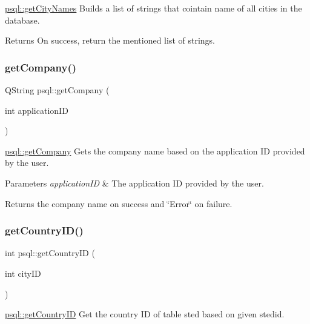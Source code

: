 \hyperlink{classpsql_a42ee0cf90055ba6a7a6f564cf04d8bb8}{psql\+::get\+City\+Names} Builds a list of strings that cointain name of all cities in the database. 

\begin{DoxyReturn}{Returns}
On success, return the mentioned list of strings. 
\end{DoxyReturn}
\mbox{\label{classpsql_a09745cd03f09ffb2dacacaab4281915f}} 
\subsubsection{\texorpdfstring{get\+Company()}{getCompany()}}
{\footnotesize\ttfamily Q\+String psql\+::get\+Company (\begin{DoxyParamCaption}\item[{int}]{application\+ID }\end{DoxyParamCaption})}



\hyperlink{classpsql_a09745cd03f09ffb2dacacaab4281915f}{psql\+::get\+Company} Gets the company name based on the application ID provided by the user. 


\begin{DoxyParams}{Parameters}
{\em application\+ID} & The application ID provided by the user. \\
\hline
\end{DoxyParams}
\begin{DoxyReturn}{Returns}
the company name on success and \char`\"{}\+Error\char`\"{} on failure. 
\end{DoxyReturn}
\mbox{\label{classpsql_a81d02dc0350ba11d90257914078ba432}} 
\subsubsection{\texorpdfstring{get\+Country\+I\+D()}{getCountryID()}}
{\footnotesize\ttfamily int psql\+::get\+Country\+ID (\begin{DoxyParamCaption}\item[{int}]{city\+ID }\end{DoxyParamCaption})}



\hyperlink{classpsql_a81d02dc0350ba11d90257914078ba432}{psql\+::get\+Country\+ID} Get the country ID of table sted based on given stedid. 


